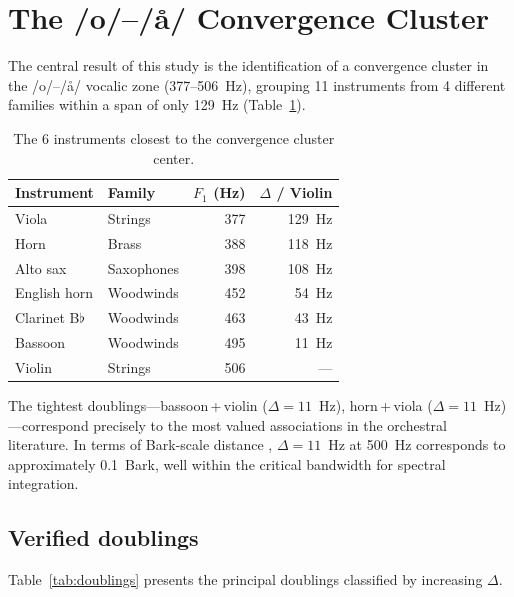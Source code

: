 \documentclass[12pt,a4paper]{article}
\begin{document}
\section{The /o/--/\aa/ Convergence Cluster}

The central result of this study is the identification of a convergence cluster
in the /o/--/\aa/ vocalic zone (377--506~Hz), grouping 11 instruments from
4 different families within a span of only 129~Hz (Table~\ref{tab:cluster}).

\begin{table}[htbp]
\centering
\caption{The 6 instruments closest to the convergence cluster center.}
\label{tab:cluster}
\begin{tabular}{llrr}
\toprule
Instrument & Family & $F_1$ (Hz) & $\Delta$ / Violin \\
\midrule
Viola        & Strings     & 377 & 129~Hz \\
Horn         & Brass       & 388 & 118~Hz \\
Alto sax     & Saxophones  & 398 & 108~Hz \\
English horn & Woodwinds   & 452 & 54~Hz \\
Clarinet B$\flat$ & Woodwinds & 463 & 43~Hz \\
Bassoon      & Woodwinds   & 495 & 11~Hz \\
Violin       & Strings     & 506 & --- \\
\bottomrule
\end{tabular}
\end{table}

The tightest doublings---bassoon\,+\,violin ($\Delta = 11$~Hz),
horn\,+\,viola ($\Delta = 11$~Hz)---correspond precisely to the most valued
associations in the orchestral literature. In terms of Bark-scale distance
\citep{Zwicker1961}, $\Delta = 11$~Hz at 500~Hz corresponds to approximately
0.1~Bark, well within the critical bandwidth for spectral integration.

\subsection{Verified doublings}

Table~\ref{tab:doublings} presents the principal doublings classified by
increasing $\Delta$.
\end{document}
